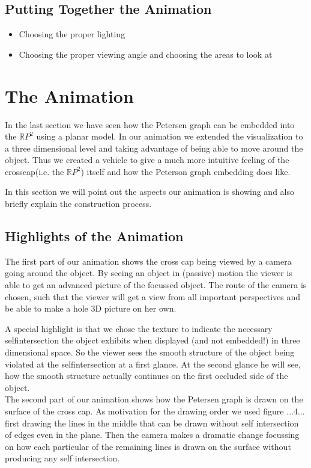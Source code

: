 \documentclass[11pt,            %
               a4paper,         %
               oneside,         %
               DIV12,           %
               fleqn,           %
               halfparskip,     %
               nochapterprefix, %
              ]{scrartcl} %
\theoremstyle{definition}
\begin{document}
\subsection{Putting Together the Animation}

\begin{itemize}
  \item Choosing the proper lighting
  \item Choosing the proper viewing angle and choosing the areas to look at
\end{itemize}

\section{The Animation}

In the last section we have seen how the Petersen graph can be embedded into the $\mathbb{R}P^2$ using a planar model. In our  animation we extended the visualization to a three dimensional level and taking advantage of being able to move around the object. Thus we created a vehicle to give a much more intuitive feeling of the crosscap(i.e. the $\mathbb{R}P^2$) itself and how the Peterson graph embedding does like.

In this section we will point out the aspects our animation is showing and also briefly explain the construction process.

\subsection{Highlights of the Animation}

The first part of our animation shows the cross cap being viewed by a camera going around the object. By seeing an object in (passive) motion the viewer is able to get an advanced picture of the focussed object. The route of the camera is chosen, such that the viewer will get a view from all important perspectives and be able to make a hole 3D picture on her own.

A special highlight is that we chose the texture to indicate the necessary selfintersection the object exhibits when displayed (and not embedded!) in three dimensional space. So the viewer sees the smooth structure of the object being violated at the selfintersection at a first glance. At the second glance he will see, how the smooth structure actually continues on the first occluded side of the object. \\

The second part of our animation shows how the Petersen graph is drawn on the surface of the cross cap. As motivation for the drawing order we used figure ...4... first drawing the lines in the middle that can be drawn without self intersection of edges even in the plane.
Then the camera makes a dramatic change focussing on how each particular of the remaining lines is drawn on the surface without producing any self intersection.
\end{document}
